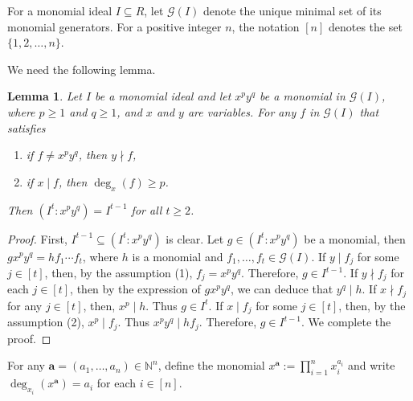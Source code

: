 \documentclass[12pt,amscd]{amsart}
\newtheorem{lem}[thm]{Lemma}
\theoremstyle{definition}
\begin{document}
For a monomial ideal $I\subseteq R$,  let  $\mathcal{G}(I)$ denote the unique minimal set of its monomial generators. For a positive integer $n$, the notation $[n]$ denotes the set $\{1,2,\dots,n\}$.

We need the following lemma.


\begin{lem}\label{dec-power} Let $I$ be a monomial ideal and let $x^py^q$ be a monomial in $\mathcal{G}(I)$, where $p \geqslant 1$ and $q\geqslant 1$, and $x$ and $y$ are variables. For any   $f$ in $\mathcal{G}(I)$ that satisfies 
\begin{enumerate}
    \item if  $f\ne x^py^q$, then $y\nmid f$,
    \item if  $x\mid f$, then $\deg_x(f)\geqslant p$.
\end{enumerate}
Then $(I^t \colon x^py^q)= I^{t-1}$ for all $t\geqslant 2$.
\end{lem}
\begin{proof} First,  $I^{t-1}\subseteq (I^t \colon x^py^q)$ is clear. Let $g\in (I^t\colon x^py^q)$ be a monomial, then $gx^py^q =hf_1\cdots f_t$, where $h$ is a monomial  and $f_1,\ldots,f_t\in \mathcal{G}(I)$.
If $y\mid f_j$ for some $j\in [t]$, then, by the  assumption (1), $f_j = x^py^q$. Therefore,  $g\in I^{t-1}$. If $y\nmid f_j$ for each $j\in [t]$, then by the expression of $gx^py^q$, we can deduce that $y^q\mid h$. If $x\nmid f_j$ for any $j\in [t]$, then,  $x^p\mid h$. Thus $g\in I^t$.
If $x\mid f_j$ for some $j\in [t]$, then, by the  assumption  (2), $x^p \mid f_j$. Thus $x^py^q \mid hf_j$. Therefore, $g\in I^{t-1}$.
We   complete the proof.
\end{proof}

 For any  $\mathbf{a}= (a_1, \ldots, a_n) \in \mathbb{N}^n$,  define the monomial $x^{\mathbf{a}} := \prod\limits_{i=1}^{n} x_i^{a_i}$ and write $\deg_{x_i}(x^{\mathbf{a}}) = a_i$ for each $i \in [n]$.
 
\end{document}
